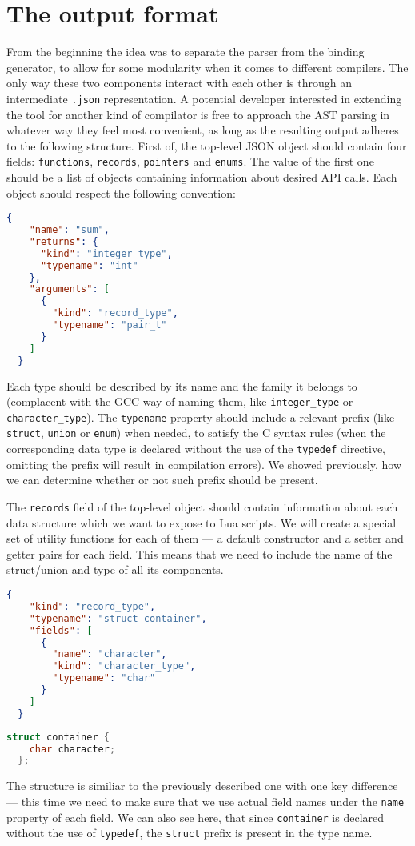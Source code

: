 \documentclass[polish, english]{iithesis}
\begin{document}
  \section{The output format}
From the beginning the idea was to separate the parser from the binding generator, to allow for some modularity when it comes to different compilers.
The only way these two components interact with each other is through an intermediate \texttt{.json} representation.
A potential developer interested in extending the tool for another kind of compilator is free to approach the AST parsing in whatever way they feel most convenient, as long as the resulting output adheres to the following structure.
First of, the top-level JSON object should contain four fields: \texttt{functions}, \texttt{records}, \texttt{pointers} and \texttt{enums}. 
The value of the first one should be a list of objects containing information about desired API calls.
Each object should respect the following convention:
\begin{lstlisting}[language=json, caption=Example API \texttt{.json} function description]
  {
    "name": "sum",
    "returns": {
      "kind": "integer_type",
      "typename": "int"
    },
    "arguments": [
      {
        "kind": "record_type",
        "typename": "pair_t"
      }
    ]
  }
\end{lstlisting}
Each type should be described by its name and the family it belongs to (complacent with the GCC way of naming them, like \texttt{integer\_type} or \texttt{character\_type}).
The \texttt{typename} property should include a relevant prefix (like \texttt{struct}, \texttt{union} or \texttt{enum}) when needed, to satisfy the C syntax rules (when the corresponding data type is declared without the use of the \texttt{typedef} directive, omitting the prefix will result in compilation errors).
We showed previously, how we can determine whether or not such prefix should be present.

The \texttt{records} field of the top-level object should contain information about each data structure which we want to expose to Lua scripts.
We will create a special set of utility functions for each of them --- a default constructor and a setter and getter pairs for each field.
This means that we need to include the name of the struct/union and type of all its components.
\begin{lstlisting}[language=json, caption=Example \texttt{records} array entry]
  {
    "kind": "record_type",
    "typename": "struct container",
    "fields": [
      {
        "name": "character",
        "kind": "character_type",
        "typename": "char"
      }
    ]
  }
\end{lstlisting}
\begin{lstlisting}[language=c, caption=Corresponding \texttt{struct container} definition]
  struct container {
    char character;
  };
\end{lstlisting}
The structure is similiar to the previously described one with one key difference --- this time we need to make sure that we use actual field names under the \texttt{name} property of each field.
We can also see here, that since \texttt{container} is declared without the use of \texttt{typedef}, the \texttt{struct} prefix is present in the type name.
\end{document}
